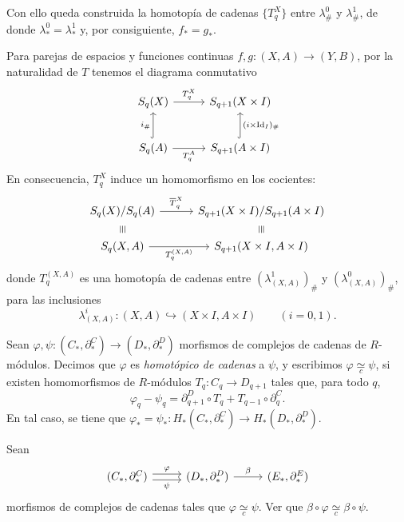 \begin{dem}
Con ello queda construida la homotopía de cadenas $\{T_q^X\}$ entre $\lambda^0_\#$ y $\lambda^1_\#$, de donde $\lambda^0_* = \lambda^1_*$ y, por consiguiente, $f_* = g_*$.
\end{dem}
\begin{nota}
Para parejas de espacios y funciones continuas $f, g \colon (X, A) \to (Y, B)$, por la naturalidad de $T$ tenemos el diagrama conmutativo
\[
\begin{tikzcd}[column sep=2.8em, row sep=2.4em]
S_q(X) \arrow[r, "T_q^X"] & S_{q+1}(X \times I) \\
S_q(A) \arrow[u, hook, "i_\#"] \arrow[r, "T_q^A"'] & S_{q+1}(A \times I) \arrow[u, hook, "(i \times \operatorname{Id}_I)_\#"']
\end{tikzcd}
\]
En consecuencia, $T_q^X$ induce un homomorfismo en los cocientes:
\[
\begin{tikzcd}[column sep=3.0em, row sep=1.4em]
S_q(X)/S_q(A) \arrow[r, "\overline{T}_q^X"] \arrow[d, phantom, "\equiv"{description, sloped, inner sep=1pt}] & S_{q+1}(X \times I)/S_{q+1}(A \times I) \arrow[d, phantom, "\equiv"{description, sloped, inner sep=1pt}] \\
S_q(X, A) \arrow[r, "T_q^{(X, A)}"'] & S_{q+1}(X \times I, A \times I)
\end{tikzcd}
\]
donde $T_q^{(X, A)}$ es una homotopía de cadenas entre $(\lambda^1_{(X, A)})_\#$ y $(\lambda^0_{(X, A)})_\#$, para las inclusiones
\[
\lambda^i_{(X, A)} \colon (X, A) \hookrightarrow (X \times I, A \times I) \qquad (i = 0, 1).
\]
\end{nota}

\begin{definicion}
Sean $\varphi, \psi \colon (C_*, \partial_*^C) \to (D_*, \partial_*^D)$ morfismos de complejos de cadenas de $R$-módulos. Decimos que $\varphi$ es \textit{homotópico de cadenas} a $\psi$, y escribimos $\varphi \underset{c}{\simeq} \psi$, si existen homomorfismos de $R$-módulos $T_q \colon C_q \to D_{q+1}$ tales que, para todo $q$,
\[
\varphi_q - \psi_q = \partial_{q+1}^D \circ T_q + T_{q-1} \circ \partial_q^C.
\]
En tal caso, se tiene que $\varphi_* = \psi_* \colon H_*(C_*, \partial_*^C) \to H_*(D_*, \partial_*^D)$.
\end{definicion}
\begin{ejercicio}
Sean
\[
\begin{tikzcd}[column sep=2.6em]
(C_*, \partial_*^C) \arrow[r, shift left=0.6ex, "\varphi"] \arrow[r, shift right=0.6ex, "\psi"'] & (D_*, \partial_*^D) \arrow[r, "\beta"] & (E_*, \partial_*^E)
\end{tikzcd}
\]
morfismos de complejos de cadenas tales que $\varphi \underset{c}{\simeq} \psi$. Ver que $\beta \circ \varphi \underset{c}{\simeq} \beta \circ \psi$.
\end{ejercicio}

